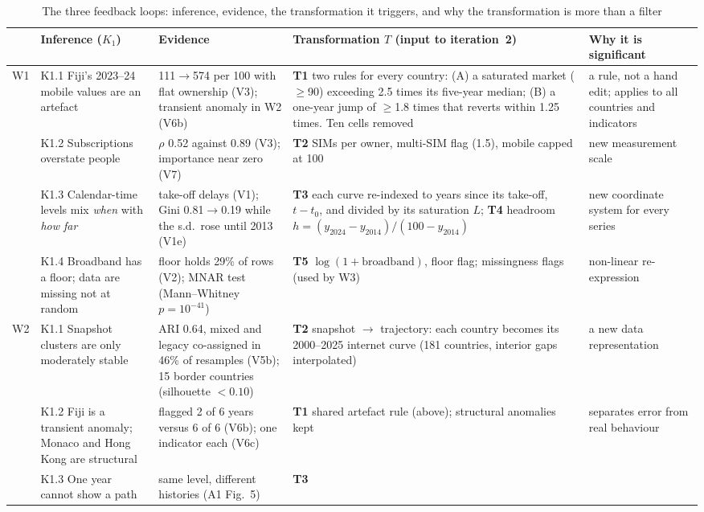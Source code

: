 \documentclass[conference,a4paper]{IEEEtran}
\begin{document}
\begin{table}[!t]
\centering
\caption{The three feedback loops: inference, evidence, the transformation it triggers, and why the
transformation is more than a filter}
\label{tab:loops}
\footnotesize
\begin{tabularx}{\textwidth}{@{}l p{3.4cm} Y Y p{3.0cm}@{}}
\toprule
& Inference ($K_1$) & Evidence & Transformation $T$ (input to iteration~2) & Why it is significant \\
\midrule
W1 & K1.1 Fiji's 2023--24 mobile values are an artefact & 111$\rightarrow$574 per 100 with flat
ownership (V3); transient anomaly in W2 (V6b) & \textbf{T1} two rules for every country: (A) a
saturated market ($\ge$90) exceeding 2.5 times its five-year median; (B) a one-year jump of $\ge$1.8
times that reverts within 1.25 times. Ten cells removed & a rule, not a hand edit; applies to all
countries and indicators \\
& K1.2 Subscriptions overstate people & $\rho$ 0.52 against 0.89 (V3); importance near zero (V7) &
\textbf{T2} SIMs per owner, multi-SIM flag (1.5), mobile capped at 100 & new measurement scale \\
& K1.3 Calendar-time levels mix \emph{when} with \emph{how far} & take-off delays (V1); Gini 0.81$\rightarrow$0.19 while the s.d.\
rose until 2013 (V1e) & \textbf{T3} each curve re-indexed to years since its take-off, $t-t_0$, and divided
by its saturation $L$; \textbf{T4} headroom $h=(y_{2024}-y_{2014})/(100-y_{2014})$ & new coordinate
system for every series \\
& K1.4 Broadband has a floor; data are missing not at random & floor holds 29\% of rows (V2); MNAR test
(Mann--Whitney $p=10^{-41}$) & \textbf{T5} $\log(1+\text{broadband})$, floor flag; missingness flags (used by W3) & non-linear
re-expression \\
\midrule
W2 & K1.1 Snapshot clusters are only moderately stable & ARI 0.64, mixed and legacy co-assigned in 46\%
of resamples (V5b); 15 border countries (silhouette $<0.10$) & \textbf{T2} snapshot $\rightarrow$ trajectory: each
country becomes its 2000--2025 internet curve (181 countries, interior gaps interpolated) & a new data
representation \\
& K1.2 Fiji is a transient anomaly; Monaco and Hong Kong are structural & flagged 2 of 6 years versus 6
of 6 (V6b); one indicator each (V6c) & \textbf{T1} shared artefact rule (above); structural anomalies
kept & separates error from real behaviour \\
& K1.3 One year cannot show a path & same level, different histories (A1 Fig.~5) & \textbf{T3}

\end{tabularx}
\end{table}
\end{document}
